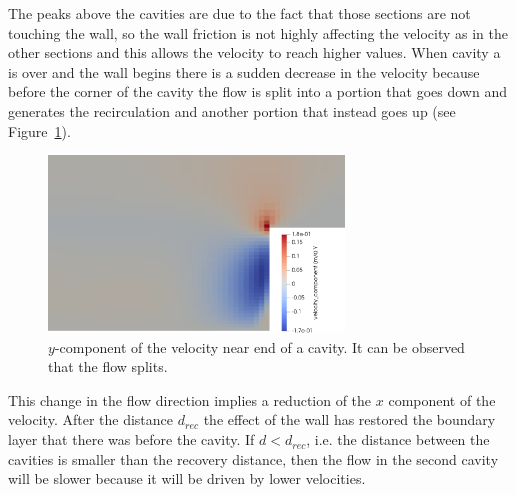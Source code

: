 \documentclass[11pt, a4paper]{article}
\theoremstyle{definition}
\begin{document}
The peaks above the cavities are due to the fact that those sections are not 
touching the wall, so the wall friction is not highly affecting the velocity as 
in the other sections and this allows the velocity to reach higher values.
When cavity a is over and the wall begins there is a sudden decrease in the 
velocity because before the corner of the cavity the flow is split into a 
portion that goes down and generates the recirculation and another portion that 
instead goes up (see Figure~\ref{fig:vel_split}).
\begin{figure}
	\centering
	\includegraphics[width=0.7\textwidth]{cavities_vel_split.png}
	\caption{$y$-component of the velocity near end of a cavity. It can be 
		observed that the flow splits.}
	\label{fig:vel_split}
\end{figure}
This change in the flow 
direction implies a reduction of the $x$ component of the velocity. After the 
distance $d_{rec}$ the effect of the wall has restored the boundary layer that 
there was before the cavity. If $d < d_{rec}$, i.e. the distance between the 
cavities is smaller than the recovery distance, then the flow in the second 
cavity will be slower because it will be driven by lower velocities.
\end{document}
